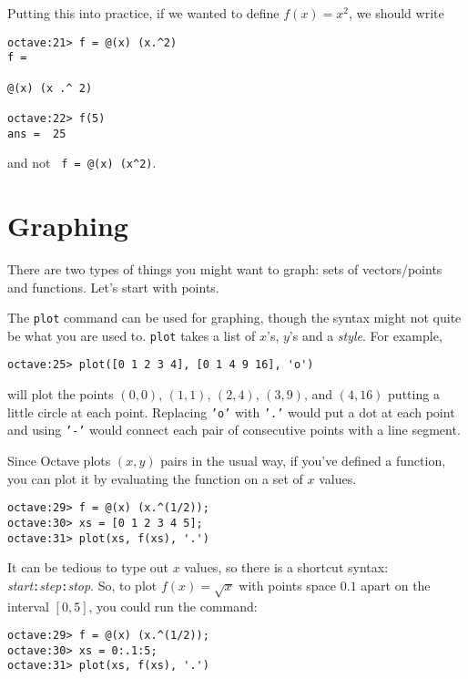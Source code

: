 \documentclass[letter]{article}
\begin{document}
	Putting this into practice, if we wanted to define $f(x)=x^2$, we should write
	\begin{lstlisting}[style=Matlab-Pyglike,escapechar=`]
octave:21> f = @(x) (x.^2)
f =

@(x) (x .^ 2)

octave:22> f(5)
ans =  25
	\end{lstlisting}
	and not \verb| f = @(x) (x^2)|.

	\section{Graphing}
	There are two types of things you might want to graph: sets of vectors/points and functions.
	Let's start with points.

	The {\tt plot} command can be used for graphing, though the syntax might not quite be
	what you are used to.  {\tt plot} takes a list of $x$'s, $y$'s and a \emph{style}.  For example,
	\begin{lstlisting}[style=Matlab-Pyglike,escapechar=`]
octave:25> plot([0 1 2 3 4], [0 1 4 9 16], 'o')
	\end{lstlisting}
	will plot the points $(0,0)$, $(1,1)$, $(2,4)$, $(3,9)$, and $(4,16)$ putting a little circle
	at each point.  Replacing {\tt 'o'} with {\tt '.'} would put a dot at each point and
	using {\tt '-'} would connect each pair of consecutive points with a line segment.

	Since {\sc Octave} plots $(x,y)$ pairs in the usual way, if you've defined a function, you
	can plot it by evaluating the function on a set of $x$ values.
	\begin{lstlisting}[style=Matlab-Pyglike,escapechar=`]
octave:29> f = @(x) (x.^(1/2));
octave:30> xs = [0 1 2 3 4 5];
octave:31> plot(xs, f(xs), '.')
	\end{lstlisting}

	It can be tedious to type out $x$ values, so there is a shortcut syntax: \emph{start}{\tt :}\emph{step}{\tt :}\emph{stop}.
	So, to plot $f(x)=\sqrt{x}$ with points space $0.1$ apart on the interval $[0,5]$, you could run the command:
	\begin{lstlisting}[style=Matlab-Pyglike,escapechar=`]
octave:29> f = @(x) (x.^(1/2));
octave:30> xs = 0:.1:5;
octave:31> plot(xs, f(xs), '.')
	\end{lstlisting}
\end{document}
